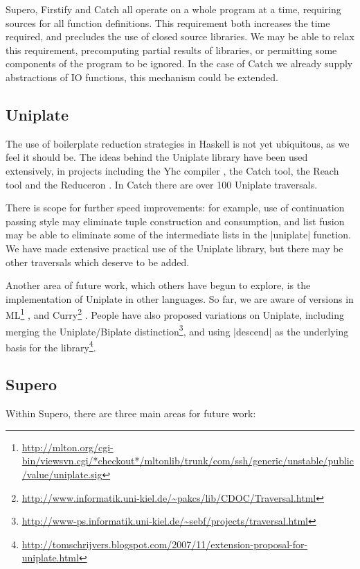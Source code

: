 Supero, Firstify and Catch all operate on a whole program at a time, requiring sources for all function definitions. This requirement both increases the time required, and precludes the use of closed source libraries. We may be able to relax this requirement, precomputing partial results of libraries, or permitting some components of the program to be ignored. In the case of Catch we already supply abstractions of IO functions, this mechanism could be extended.

\subsection{Uniplate}

The use of boilerplate reduction strategies in Haskell is not yet ubiquitous, as we feel it should be. The ideas behind the Uniplate library have been used extensively, in projects including the Yhc compiler \citep{me:yhc_core}, the Catch tool, the Reach tool \cite{naylor:reach} and the Reduceron \cite{naylor:reduceron}. In Catch there are over 100 Uniplate traversals.

There is scope for further speed improvements: for example, use of continuation passing style may eliminate tuple construction and consumption, and list fusion may be able to eliminate some of the intermediate lists in the |uniplate| function. We have made extensive practical use of the Uniplate library, but there may be other traversals which deserve to be added.

Another area of future work, which others have begun to explore, is the implementation of Uniplate in other languages. So far, we are aware of versions in ML\footnote{\url{http://mlton.org/cgi-bin/viewsvn.cgi/*checkout*/mltonlib/trunk/com/ssh/generic/unstable/public/value/uniplate.sig}} \cite{ml}, and Curry\footnote{\url{http://www.informatik.uni-kiel.de/~pakcs/lib/CDOC/Traversal.html}} \cite{curry}. People have also proposed variations on Uniplate, including merging the Uniplate/Biplate distinction\footnote{\url{http://www-ps.informatik.uni-kiel.de/~sebf/projects/traversal.html}}, and using |descend| as the underlying basis for the library\footnote{\url{http://tomschrijvers.blogspot.com/2007/11/extension-proposal-for-uniplate.html}}.

\subsection{Supero}

Within Supero, there are three main areas for future work:


